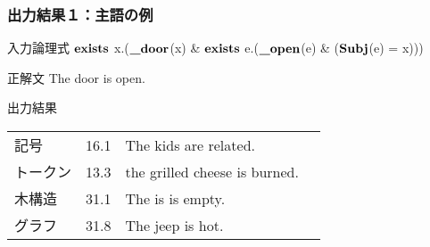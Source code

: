 \documentclass[dvipdfmx]{beamer}
\newcommand{\highlight}[3][38]{\tikz[baseline=(x.base)]{
 \node[rectangle,rounded corners,fill=#2!#1](x){#3};}}
\newcommand{\LF}[1]{\ensuremath{\texttt{\bf #1}}}
\begin{document}



\begin{frame}
\frametitle{出力結果１：主語の例}

\begin{block}{入力論理式}
  \LF{exists} x.(\LF{\_door}(x) \& \LF{exists} e.(\LF{\_open}(e) \& (\LF{Subj}(e) = x)))
\end{block}

\begin{block}{正解文}
  The door is open.
\end{block}

\begin{block}{出力結果}
\begin{table}[h]
\begin{tabular}{llll} \hline
記号 & 16.1& The kids are related.\\
トークン & 13.3 & the grilled cheese is burned.\\
木構造 & 31.1 & The is is empty.\\
グラフ & 31.8 & The jeep is hot.\\ \hline
\end{tabular}
\label{tab:example3}
\end{table}
\end{block}
\end{frame}
\end{document}
